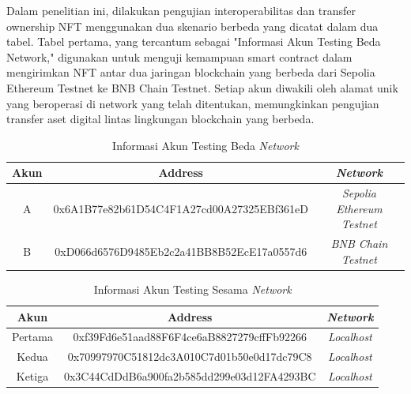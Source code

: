 Dalam penelitian ini, dilakukan pengujian interoperabilitas dan transfer ownership NFT menggunakan dua skenario berbeda yang dicatat dalam dua tabel. Tabel pertama, yang tercantum sebagai "Informasi Akun Testing Beda Network," digunakan untuk menguji kemampuan smart contract dalam mengirimkan NFT antar dua jaringan blockchain yang berbeda dari Sepolia Ethereum Testnet ke BNB Chain Testnet. Setiap akun diwakili oleh alamat unik yang beroperasi di network yang telah ditentukan, memungkinkan pengujian transfer aset digital lintas lingkungan blockchain yang berbeda. 

\begin{center}
\begin{table}[H]
      \centering
      \caption{Informasi Akun Testing Beda \emph{Network}}
      \begin{tabular}{|c|c|c|}
      \hline
      \textbf{Akun} & \textbf{Address} & \textbf{\emph{Network}}
      \\
      \hline
      A & 0x6A1B77e82b61D54C4F1A27cd00A27325EBf361eD & \emph{Sepolia Ethereum Testnet}
      \\ 
      \hline
      B & 0xD066d6576D9485Eb2c2a41BB8B52EcE17a0557d6 & \emph{BNB Chain Testnet} \\
      \hline
      \end{tabular}      
      \label{tab:akun_beda_multiple_network}
\end{table}
\end{center}

\begin{center}
  \begin{table}[H]
        \centering
        \caption{Informasi Akun Testing Sesama \emph{Network}}
        \begin{tabular}{|c|c|c|}
        \hline
        \textbf{Akun} & \textbf{Address} & \textbf{\emph{Network}}
        \\
        \hline
        Pertama & 0xf39Fd6e51aad88F6F4ce6aB8827279cffFb92266 & \emph{Localhost}
        \\ 
        \hline
        Kedua & 0x70997970C51812dc3A010C7d01b50e0d17dc79C8 & \emph{Localhost} \\
        \hline
        Ketiga & 0x3C44CdDdB6a900fa2b585dd299e03d12FA4293BC & \emph{Localhost} \\
        \hline
        \end{tabular}      
        \label{tab:akun_localhost}
  \end{table}
  \end{center}
  
